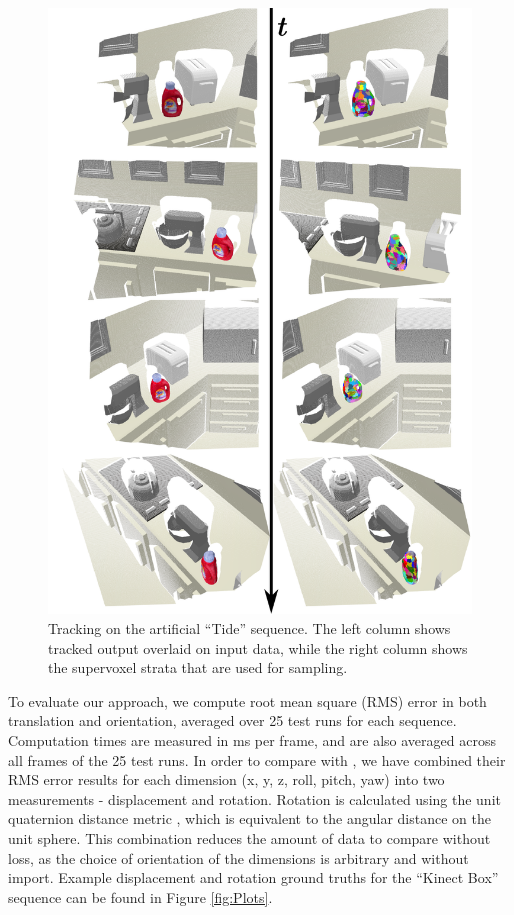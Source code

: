 \begin{figure}[!t]
  \centering
  \includegraphics[width=1.06\linewidth]{figures/Tracking/TideMontage.pdf}
  \caption[Tracking on the artificial ``Tide'' sequence.]{Tracking on the artificial ``Tide'' sequence. The left column shows tracked output overlaid on input data, while the right column shows the supervoxel strata that are used for sampling.}
  \label{fig:TideMontage}
\end{figure}


To evaluate our approach, we compute root mean square (RMS) error in both translation and orientation, averaged over 25 test runs for each sequence. Computation times are measured in ms per frame, and are also averaged across all frames of the 25 test runs. In order to compare with \cite{Choi_IROS2013}, we have combined their RMS error results for each dimension (x, y, z, roll, pitch, yaw) into two measurements - displacement and rotation. Rotation is calculated using the unit quaternion distance metric \cite{Kuffner_ICRA2004}, which is equivalent to the angular distance on the unit sphere. This combination reduces the amount of data to compare without loss, as the choice of orientation of the dimensions is arbitrary and without import. Example displacement and rotation ground truths for the ``Kinect Box'' sequence can be found in Figure \ref{fig:Plots}.

